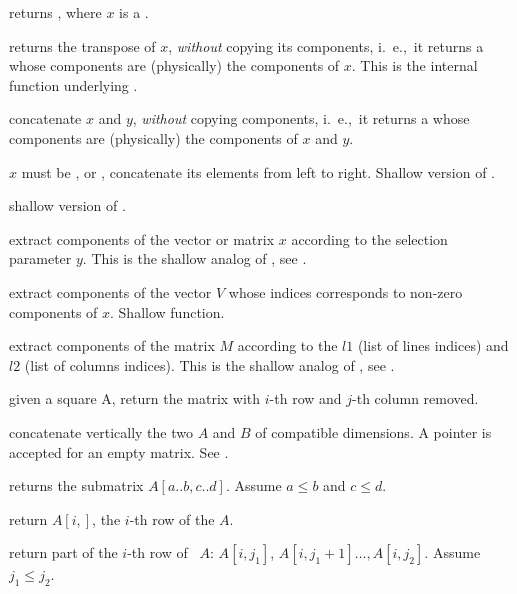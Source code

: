  returns , where $x$
is a .

 returns the transpose of $x$, \emph{without}
copying its components, i.~e.,~it returns a  whose components are
(physically) the components of $x$. This is the internal function underlying
.

 concatenate $x$ and $y$, \emph{without}
copying components, i.~e.,~it returns a  whose components are
(physically) the components of $x$ and $y$.

$x$ must be ,  or , concatenate
its elements from left to right. Shallow version of .

 shallow version of .

 extract components
of the vector or matrix $x$ according to the selection parameter $y$.
This is the shallow analog of , see .

 extract components of
the vector $V$ whose indices corresponds to non-zero components of $x$.
Shallow function.

 extract components of the
matrix $M$ according to the  $l1$ (list of lines indices) and
$l2$ (list of columns indices).
This is the shallow analog of , see .

 given a square  A,
return the matrix with $i$-th row and $j$-th column removed.

 concatenate vertically the two  $A$
and $B$ of compatible dimensions. A  pointer is accepted for an
empty matrix. See .

returns the submatrix $A[a..b,c..d]$. Assume $a \leq b$ and  $c \leq d$.

 return $A[i,]$, the $i$-th row of the 
$A$.

 return part of the $i$-th
row of ~$A$: $A[i,j_1]$, $A[i,j_1+1]\dots,A[i,j_2]$. Assume $j_1
\leq j_2$.


